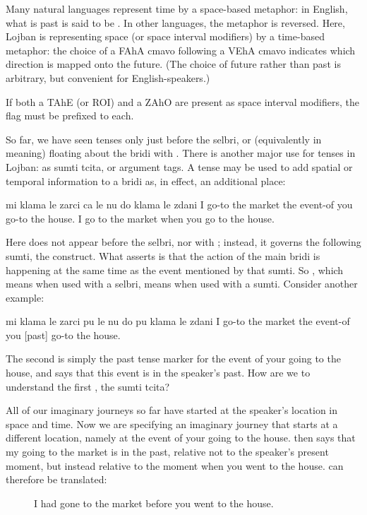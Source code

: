 Many natural languages represent time by a space-based
    metaphor: in English, what is past is said to be .
    In other languages, the metaphor is reversed. Here, Lojban is
    representing space (or space interval modifiers) by a
    time-based metaphor: the choice of a FAhA cmavo following a
    VEhA cmavo indicates which direction is mapped onto the future.
    (The choice of future rather than past is arbitrary, but
    convenient for English-speakers.)

If both a TAhE (or ROI) and a ZAhO are present as space
    interval modifiers, the  flag must be prefixed to
    each.



So far, we have seen tenses only just before the selbri, or
    (equivalently in meaning) floating about the bridi with .
    There is another major use for tenses in Lojban: as sumti
    tcita, or argument tags. A tense may be used to add spatial or
    temporal information to a bridi as, in effect, an additional
    place:
\begin{example}
mi klama le zarci ca le nu\n
\T	do klama le zdani\n
I go-to the market  the event-of\n
\T	you go-to the house.\n
I go to the market when you go to the house.
\end{example}

Here  does not appear before the selbri, nor with ;
    instead, it governs the following sumti, the 
    construct. What  asserts is
    that the action of the main bridi is happening at the same time
    as the event mentioned by that sumti. So , which means
     when used with a selbri, means 
    when used with a sumti. Consider another example:
\begin{example}
mi klama le zarci pu le nu\n
\T	do pu klama le zdani\n
I go-to the market  the event-of\n
\T	you [past] go-to the house.
\end{example}

The second  is simply the past tense marker for the
    event of your going to the house, and says that this event is
    in the speaker's past. How are we to understand the first
    , the sumti tcita?

All of our imaginary journeys so far have started at the
    speaker's location in space and time. Now we are specifying an
    imaginary journey that starts at a different location, namely
    at the event of your going to the house.  then says that my going to the
    market is in the past, relative not to the speaker's present
    moment, but instead relative to the moment when you went to the
    house.  can therefore be
    translated:
\begin{description}
\item[] I had gone to the market before you went to the house.
\end{description}

